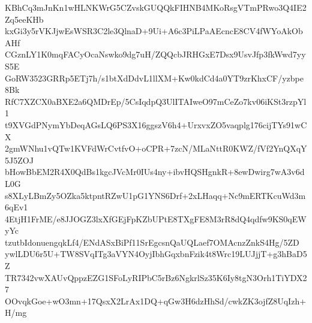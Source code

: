 KBhCq3mJnKn1wHLNKWrG5CZvskGUQQkFIHNB4MKoRsgVTmPRwo3Q4IE2Zq5eeKHb
kxGi3y5rVKJjwEsWSR3C2le3QlnaD+9Ui+A6c3PiLPaAEcncE8CV4fWYoAkObAHf
CGznLY1K0mqFACyOcaNswko9dg7uH/ZQQcbJRHGxE7Dsx9UsvJfp3fkWwd7yyS5E
GoRW3523GRRp5ETj7h/s1btXdDdvL1llXM+Kw0kdCd4a0YT9zrKhxCF/yzbpe8Bk
RfC7XZCX0aBXE2a6QMDrEp/5CsIqdpQ3UlITAIweO97mCeZo7kv06iKSt3rzpYl1
t9XVGdPNymYbDeqAGsLQ6PS3X16ggszV6h4+UrxvxZO5vaqplg176cijTYs91wCX
2gmWNhu1vQTw1KVFdWrCvtfvO+oCPR+7zcN/MLaNttR0KWZ/fVf2YnQXqY5J5ZOJ
bHowBbEM2R4X0QdBs1kgcJVcMr0IUs4ny+ibvHQSHgnkR+8ewDwirg7wA3v6dL0G
s8XLyLBmZy5OZka5ktpntRZwU1pG1YNS6Drf+2xLHaqq+Nc9mERTKcuWd3m6qEv1
4EtjH1FrME/e8JJOGZ3lxXfGEjFpKZbUPtE8TXgFE8M3rR8dQ4qdfw9KS0qEWyYc
tzutbIdonuengqkLf4/ENdASxBiPf11SrEgcsnQaUQLaef7OMAcnzZnkS4Hg/5ZD
ywlLDU6r5U+TW8SVqITg3aVYN4OyjIbhGqxbnFzik4t8Wrc19LUJjjT+g3hBaD5Z
TR7342vwXAUvQppzEZG1SFoLyRIPbC5rBz6NgkrlSz35K6Iy8tgN3Orh1TiYDX27
OOvqkGoe+wO3mn+17QsxX2LrAx1DQ+qGw3H6dzHhSd/cwkZK3ojfZ8UqIzh+H/mg
